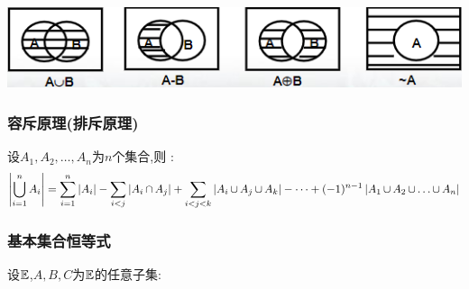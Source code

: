 {{{  \begin{center}
    \includegraphics{resources/Venn's_diagram.png}
  \end{center}
}%

\subsubsection{容斥原理(排斥原理)}{
  设$A_1,A_2,\dots,A_n$为$n$个集合,则 : $$
    \absoluteValue{\updownUnion{n}{i = 1}A_i} = \upDownSum{n}{i = 1}\absoluteValue{A_i} - \upDownSum{\ }{i < j}\absoluteValue{A_i \intersectionSet A_j} + \upDownSum{\ }{i < j < k}\absoluteValue{A_i \unionSet A_j \unionSet A_k} - \dots + (-1)^{n - 1}\absoluteValue{A_1 \unionSet A_2 \unionSet \dots \unionSet A_n}
  $$
}

\subsubsection{基本集合恒等式}{
  设$\mathEverythingCollection$,$A,B,C$为$\mathEverythingCollection$的任意子集:

}}}
